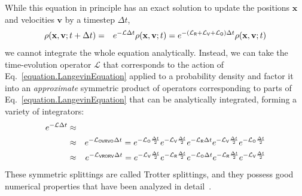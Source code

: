 \documentclass[aip,jcp,preprint,superscriptaddress,floatfix]{revtex4-1}
\newcommand{\x}{\mathbf{x}}
\newcommand{\vel}{\mathbf{v}}
\newcommand{\splitting}[1]{{\bf \sf #1}} %
\begin{document}
While this equation in principle has an exact solution to update the positions $\x$ and velocities $\vel$ by a timestep $\Delta t$, 
\begin{eqnarray}
\rho(\x, \vel; t + \Delta t) &=& e^{- \mathcal{L} \Delta t} \rho(\x, \vel; t) = e^{- (\mathcal{L}_\splitting{R} + \mathcal{L}_\splitting{V} + \mathcal{L}_\splitting{O}) \Delta t} \rho(\x, \vel; t)
\end{eqnarray}
we cannot integrate the whole equation analytically.
Instead, we can take the time-evolution operator $\mathcal{L}$ that corresponds to the action of Eq.~\ref{equation.LangevinEquation} applied to a probability density and factor it into an \emph{approximate} symmetric product of operators corresponding to parts of Eq.~\ref{equation.LangevinEquation} that can be analytically integrated, forming a variety of integrators:
\begin{eqnarray}
e^{- \mathcal{L} \Delta t} &\approx& \\
&\approx& e^{-\mathcal{L}_\splitting{O V R V O} \Delta t} = e^{-\mathcal{L}_\splitting{O} \frac{\Delta t}{2}} e^{-\mathcal{L}_\splitting{V} \frac{\Delta t}{2}} e^{-\mathcal{L}_\splitting{R} \Delta t} e^{-\mathcal{L}_\splitting{V} \frac{\Delta t}{2}} e^{-\mathcal{L}_\splitting{O} \frac{\Delta t}{2}} \\
&\approx& e^{-\mathcal{L}_\splitting{V R O R V} \Delta t} = e^{-\mathcal{L}_\splitting{V} \frac{\Delta t}{2}} e^{-\mathcal{L}_\splitting{R} \frac{\Delta t}{2}} e^{-\mathcal{L}_\splitting{O} \Delta t} e^{-\mathcal{L}_\splitting{R} \frac{\Delta t}{2}} e^{-\mathcal{L}_\splitting{V} \frac{\Delta t}{2}} \\
\end{eqnarray}
These symmetric splittings are called Trotter splittings, and they possess good numerical properties that have been analyzed in detail~\cite{LeimkuhlerMatthewsBook,LelievreBook}.
\end{document}
